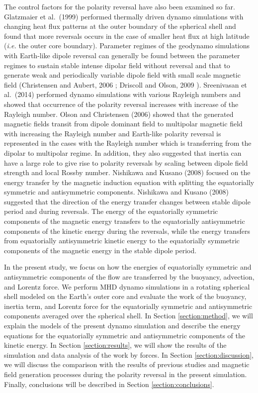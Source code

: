The control factors for the polarity reversal have also been examined so far.
Glatzmaier et al.\ (1999) \cite{Glatzmaier:1999} performed thermally driven dynamo simulations with changing heat flux patterns at the outer boundary of the spherical shell and found that more reversals occurs in the case of smaller heat flux at high latitude ({\it i.e.} the outer core boundary).
Parameter regimes of the geodynamo simulations with Earth-like dipole reversal can generally be found between the parameter regimes to sustain stable intense dipolar field without reversal and that to generate weak and periodically variable dipole field with small scale magnetic field (Christensen and Aubert, 2006 \cite{aubert:2006}; Driscoll and Olson, 2009 \cite{driscoll:2009}).
Sreenivasan et al.\ (2014) \cite{Sreenivasan:2014} performed dynamo simulations with various Rayleigh numbers and showed that occurrence of the polarity reversal increases with increase of the Rayleigh number. 
Olson and Christensen (2006) \cite{Olson:2006} showed that the generated magnetic fields transit from dipole dominant field to multipolar magnetic field with increasing the Rayleigh number and Earth-like polarity reversal is represented in the cases with the Rayleigh number which is transferring from the dipolar to multipolar regime. 
In addition, they also suggested that inertia can have a large role to give rise to polarity reversals by scaling between dipole field strength and local Rossby number.
Nishikawa and Kusano (2008) \cite{Nishikawa:2008} focused on the energy transfer by the magnetic induction equation with splitting the equatorially symmetric and antisymmetric components. 
Nishikawa and Kusano (2008) suggested that the direction of the energy transfer changes between stable dipole period and during reversals. 
The energy of the equatorially symmetric components of the magnetic energy transfers to the equatorially antisymmetric components of the kinetic energy during the reversals, while the energy transfers from equatorially antisymmetric kinetic energy to the equatorially symmetric components of the magnetic energy in the stable dipole period.

In the present study, we focus on how the energies of equatorially symmetric and antisymmetric components of the flow are transferred by the buoyancy, advection, and Lorentz force. 
We perform MHD dynamo simulations in a rotating spherical shell modeled on the Earth's outer core and evaluate the work of the buoyancy, inertia term, and Lorentz force for the equatorially symmetric and antisymmetric components averaged over the spherical shell. 
In Section \ref{section:method}, we will explain the models of the present dynamo simulation and describe the energy equations for the equatorially symmetric and antisymmetric components of the kinetic energy. 
In Section \ref{section:results}, we will show the results of the simulation and data analysis of the work by forces. 
In Section \ref{section:discussion}, we will discuss the comparison with the results of previous studies and magnetic field generation processes during the polarity reversal in the present simulation. 
Finally, conclusions will be described in Section \ref{section:conclusions}.
